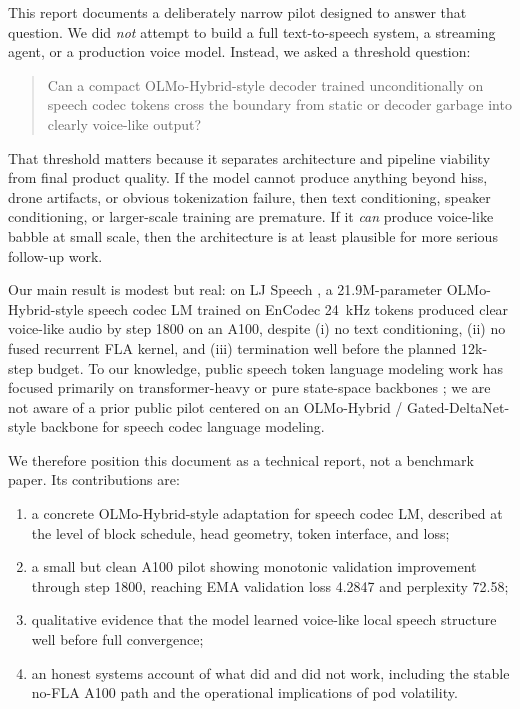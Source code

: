 \documentclass[11pt]{article}
\begin{document}
This report documents a deliberately narrow pilot designed to answer that question. We did \emph{not} attempt to build a full text-to-speech system, a streaming agent, or a production voice model. Instead, we asked a threshold question:

\begin{quote}
Can a compact OLMo-Hybrid-style decoder trained unconditionally on speech codec tokens cross the boundary from static or decoder garbage into clearly voice-like output?
\end{quote}

That threshold matters because it separates architecture and pipeline viability from final product quality. If the model cannot produce anything beyond hiss, drone artifacts, or obvious tokenization failure, then text conditioning, speaker conditioning, or larger-scale training are premature. If it \emph{can} produce voice-like babble at small scale, then the architecture is at least plausible for more serious follow-up work.

Our main result is modest but real: on LJ Speech \citep{ito2017ljspeech}, a 21.9M-parameter OLMo-Hybrid-style speech codec LM trained on EnCodec 24~kHz tokens \citep{defossez2022encodec} produced clear voice-like audio by step 1800 on an A100, despite (i) no text conditioning, (ii) no fused recurrent FLA kernel, and (iii) termination well before the planned 12k-step budget. To our knowledge, public speech token language modeling work has focused primarily on transformer-heavy or pure state-space backbones \citep{borsos2022audiolm, wang2023valle, zhang2023speechtokenizer, lu2025duplexmamba}; we are not aware of a prior public pilot centered on an OLMo-Hybrid / Gated-DeltaNet-style backbone for speech codec language modeling.

We therefore position this document as a technical report, not a benchmark paper. Its contributions are:

\begin{enumerate}
    \item a concrete OLMo-Hybrid-style adaptation for speech codec LM, described at the level of block schedule, head geometry, token interface, and loss;
    \item a small but clean A100 pilot showing monotonic validation improvement through step 1800, reaching EMA validation loss 4.2847 and perplexity 72.58;
    \item qualitative evidence that the model learned voice-like local speech structure well before full convergence;
    \item an honest systems account of what did and did not work, including the stable no-FLA A100 path and the operational implications of pod volatility.
\end{enumerate}
\end{document}
